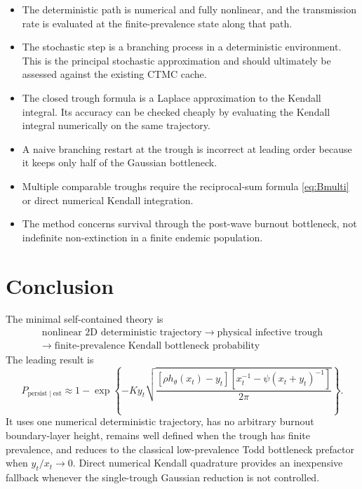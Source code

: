 \documentclass[11pt]{article}
\newcommand{\hth}{h_\theta}
\begin{document}
\begin{itemize}
\item The deterministic path is numerical and fully nonlinear, and the transmission rate is evaluated at the finite-prevalence state along that path.
\item The stochastic step is a branching process in a deterministic environment. This is the principal stochastic approximation and should ultimately be assessed against the existing CTMC cache.
\item The closed trough formula is a Laplace approximation to the Kendall integral. Its accuracy can be checked cheaply by evaluating the Kendall integral numerically on the same trajectory.
\item A naive branching restart at the trough is incorrect at leading order because it keeps only half of the Gaussian bottleneck.
\item Multiple comparable troughs require the reciprocal-sum formula \eqref{eq:Bmulti} or direct numerical Kendall integration.
\item The method concerns survival through the post-wave burnout bottleneck, not indefinite non-extinction in a finite endemic population.
\end{itemize}

\section{Conclusion}

The minimal self-contained theory is
\[
\boxed{
\begin{gathered}
\text{nonlinear 2D deterministic trajectory}
\;\longrightarrow\;
\text{physical infective trough}\\
\longrightarrow\;
\text{finite-prevalence Kendall bottleneck probability}
\end{gathered}}
\]
The leading result is
\[
\boxed{
P_{\mathrm{persist}\mid\mathrm{est}}
\approx
1-\exp\left\{
-Ky_t
\sqrt{
\frac{
[\rho\hth(x_t)-y_t]
\left[x_t^{-1}-\psi(x_t+y_t)^{-1}\right]
}{2\pi}}
\right\}.}
\]
It uses one numerical deterministic trajectory, has no arbitrary burnout boundary-layer height, remains well defined when the trough has finite prevalence, and reduces to the classical low-prevalence Todd bottleneck prefactor when \(y_t/x_t\to0\). Direct numerical Kendall quadrature provides an inexpensive fallback whenever the single-trough Gaussian reduction is not controlled.
\end{document}
